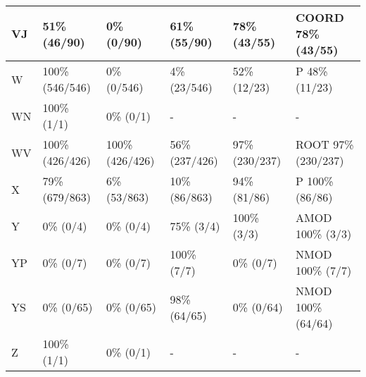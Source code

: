 \begin{small}
\begin{longtable}{|l|l|l|l|l|l|}
\hline
VJ & 51\% (46/90) & 0\% (0/90) & 61\% (55/90) & 78\% (43/55) & COORD 78\% (43/55) \\ 
\hline
W & 100\% (546/546) & 0\% (0/546) & 4\% (23/546) & 52\% (12/23) & P 48\% (11/23) \\ 
\hline
WN & 100\% (1/1) & 0\% (0/1) & - & - & - \\ 
\hline
WV & 100\% (426/426) & 100\% (426/426) & 56\% (237/426) & 97\% (230/237) & ROOT 97\% (230/237) \\ 
\hline
X & 79\% (679/863) & 6\% (53/863) & 10\% (86/863) & 94\% (81/86) & P 100\% (86/86) \\ 
\hline
Y & 0\% (0/4) & 0\% (0/4) & 75\% (3/4) & 100\% (3/3) & AMOD 100\% (3/3) \\ 
\hline
YP & 0\% (0/7) & 0\% (0/7) & 100\% (7/7) & 0\% (0/7) & NMOD 100\% (7/7) \\ 
\hline
YS & 0\% (0/65) & 0\% (0/65) & 98\% (64/65) & 0\% (0/64) & NMOD 100\% (64/64) \\ 
\hline
Z & 100\% (1/1) & 0\% (0/1) & - & - & - \\ 
\hline
\end{longtable}
\end{small}
